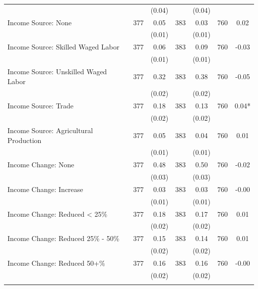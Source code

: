 \begin{tabular}{@{\extracolsep{5pt}}lcccccc}
 &   & (0.04)  &   & (0.04)  &   &  \\ [1ex]
Income Source: None   & 377    & 0.05    & 383    & 0.03    & 760    & 0.02   \\
 &   & (0.01)  &   & (0.01)  &   &  \\ [1ex]
Income Source: Skilled Waged Labor   & 377    & 0.06    & 383    & 0.09    & 760    & -0.03   \\
 &   & (0.01)  &   & (0.01)  &   &  \\ [1ex]
Income Source: Unskilled Waged Labor   & 377    & 0.32    & 383    & 0.38    & 760    & -0.05   \\
 &   & (0.02)  &   & (0.02)  &   &  \\ [1ex]
Income Source: Trade   & 377    & 0.18    & 383    & 0.13    & 760    & 0.04*   \\
 &   & (0.02)  &   & (0.02)  &   &  \\ [1ex]
Income Source: Agricultural Production   & 377    & 0.05    & 383    & 0.04    & 760    & 0.01   \\
 &   & (0.01)  &   & (0.01)  &   &  \\ [1ex]
Income Change: None   & 377    & 0.48    & 383    & 0.50    & 760    & -0.02   \\
 &   & (0.03)  &   & (0.03)  &   &  \\ [1ex]
Income Change: Increase   & 377    & 0.03    & 383    & 0.03    & 760    & -0.00   \\
 &   & (0.01)  &   & (0.01)  &   &  \\ [1ex]
Income Change: Reduced < 25\%   & 377    & 0.18    & 383    & 0.17    & 760    & 0.01   \\
 &   & (0.02)  &   & (0.02)  &   &  \\ [1ex]
Income Change: Reduced 25\% - 50\%   & 377    & 0.15    & 383    & 0.14    & 760    & 0.01   \\
 &   & (0.02)  &   & (0.02)  &   &  \\ [1ex]
Income Change: Reduced 50+\%   & 377    & 0.16    & 383    & 0.16    & 760    & -0.00   \\
 &   & (0.02)  &   & (0.02)  &   &  \\ [1ex]
\hline \hline \\[-1.8ex]

\end{tabular}
